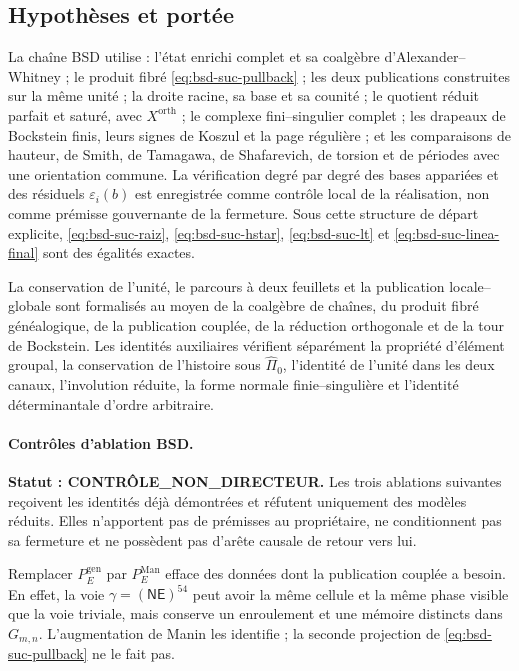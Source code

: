 \subsection*{Hypothèses et portée}

La chaîne BSD utilise : l'état enrichi complet et sa coalgèbre
d'Alexander--Whitney ; le produit fibré \eqref{eq:bsd-suc-pullback} ; les deux
publications construites sur la même unité ; la droite racine, sa base et sa
counité ; le quotient réduit parfait et saturé, avec
\(X^{\mathrm{orth}}\) ; le complexe fini--singulier complet ; les drapeaux
de Bockstein finis, leurs signes de Koszul et la page régulière ; et les
comparaisons de hauteur, de Smith, de Tamagawa, de Shafarevich, de torsion et de périodes
avec une orientation commune. La vérification degré par degré des bases
appariées et des résiduels \(\varepsilon_i(b)\) est enregistrée comme
contrôle local de la réalisation, non comme prémisse gouvernante de la fermeture.
Sous cette structure de départ explicite,
\eqref{eq:bsd-suc-raiz}, \eqref{eq:bsd-suc-hstar},
\eqref{eq:bsd-suc-lt} et \eqref{eq:bsd-suc-linea-final} sont des égalités
exactes.

La conservation de l'unité, le parcours à deux feuillets et la publication
locale--globale sont formalisés au moyen de la coalgèbre de chaînes, du produit
fibré généalogique, de la publication couplée, de la réduction orthogonale et de la
tour de Bockstein. Les identités auxiliaires vérifient séparément la propriété d'élément groupal,
la conservation de l'histoire sous \(\widehat\Pi_0\), l'identité de
l'unité dans les deux canaux, l'involution réduite, la forme normale
finie--singulière et l'identité déterminantale d'ordre arbitraire.

\paragraph{Contrôles d'ablation BSD.}
\noindent\textbf{Statut : CONTRÔLE\_NON\_DIRECTEUR.}
Les trois ablations suivantes reçoivent les identités déjà démontrées et
réfutent uniquement des modèles réduits. Elles n'apportent pas de prémisses au propriétaire,
ne conditionnent pas sa fermeture et ne possèdent pas d'arête causale de retour vers lui.

\begin{ablation}
\label{abl:bsd-suc-manin}
Remplacer \(P_E^{\mathrm{gen}}\) par \(P_E^{\mathrm{Man}}\) efface des données dont
la publication couplée a besoin. En effet, la voie
\(\gamma=(\mathsf N\mathsf E)^{54}\) peut avoir la même cellule et la même
phase visible que la voie triviale, mais conserve un enroulement et une mémoire
distincts dans \(G_{m,n}\). L'augmentation de Manin les identifie ; la seconde
projection de \eqref{eq:bsd-suc-pullback} ne le fait pas.
\end{ablation}

